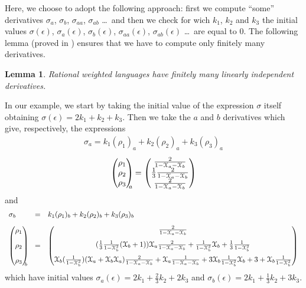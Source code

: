 \documentclass[3p]{elsarticle}
\newcommand{\streamproduct}{\times} %
\newtheorem{lemma}{Lemma}
\begin{document}

Here, we choose to adopt the following approach: first we compute ``some'' derivatives $\sigma_a$, $\sigma_b$, $\sigma_{aa}$, $\sigma_{ab}$ \dots\ and then
we check for wich $k_1$, $k_2$ and $k_3$ the initial values $\sigma(\epsilon)$, $\sigma_a(\epsilon)$, $\sigma_b(\epsilon)$, $\sigma_{aa}(\epsilon)$, $\sigma_{ab}(\epsilon)$ \dots\ are equal to $0$.
The following lemma (proved in \cite{BR-series,Rutten2003-behavioural-differential-equations}) ensures that
we have to compute only finitely many derivatives.

\begin{lemma}
Rational weighted languages have finitely many linearly independent derivatives.
\end{lemma}

In our example, we start by taking the initial value of the expression $\sigma$ itself
obtaining $\sigma(\epsilon) = 2k_1 + k_2 + k_3$. Then we take the $a$ and $b$ derivatives
which give, respectively, the expressions
\begin{eqnarray}\label{eq:der_a}
\sigma_a = k_1(\rho_1)_a + k_2(\rho_2)_a + k_3(\rho_3)_a
\end{eqnarray}
\[
 \begin{pmatrix} \rho_1 \\ \rho_2 \\ \rho_3 \end{pmatrix}_{\!\!\!\!a} =
\begin{pmatrix}
\frac{2}{1-\mathcal{X}_a-\mathcal{X}_b} \\
\frac 1 3
\frac{2}{1-\mathcal{X}_a-\mathcal{X}_b} \\ \frac{2}{1-\mathcal{X}_a-\mathcal{X}_b}
\end{pmatrix}
\]
and
$$
\begin{array}{lcl}
\sigma_b &=& k_1(\rho_1)_b + k_2(\rho_2)_b + k_3(\rho_3)_b\\[2ex]
 \begin{pmatrix} \rho_1 \\[2ex] \rho_2 \\[2ex] \rho_3 \end{pmatrix}_{\!\!\!\!b}
&=&
\begin{pmatrix}
\frac{2}{1-\mathcal{X}_a-\mathcal{X}_b} \\[2ex] (\frac{1}{3}\frac{1}{1-\mathcal{X}_b^2} (\mathcal{X}_b+1) )
\mathcal{X}_a\frac{2}{1-\mathcal{X}_a-\mathcal{X}_b} + \frac{1}{1-\mathcal{X}_b^2}\mathcal{X}_b + \frac 1 3 \frac
{1} {1-\mathcal{X}_b^2} \\[2ex] \mathcal{X}_b (\frac{1}{1-\mathcal{X}_b^2}) (\mathcal{X}_a + \mathcal{X}_b
\mathcal{X}_a)
\frac{2}{1-\mathcal{X}_a-\mathcal{X}_b}   +  \mathcal{X}_a\frac 1 {1-\mathcal{X}_a-\mathcal{X}_b}+ 3\mathcal{X}_b
\frac{1}{1-\mathcal{X}_b^2} \mathcal{X}_b + 3 + \mathcal{X}_b
\frac{1}{1-\mathcal{X}_b^2}
\end{pmatrix}
\end{array}
$$
\noindent
which have initial values $\sigma_a(\epsilon) = 2k_1 + \frac 2 3 k_2 + 2k_3$
and $\sigma_b(\epsilon) =2k_1 +
\frac 1 3 k_2+ 3k_3$.
\end{document}
